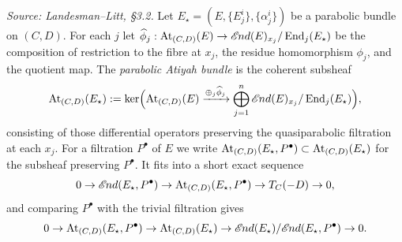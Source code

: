 \begin{definition}
  \label{def:parabolic-atiyah-bundle}
  \textit{Source: Landesman--Litt, \S3.2.}
  Let $E_\star = (E,\{E^i_j\},\{\alpha^i_j\})$ be a parabolic bundle on $(C,D)$.
  For each $j$ let $\widehat{\phi}_j: \operatorname{At}_{(C,D)}(E) \to
  \mathscr{E}\kern -1pt nd(E)_{x_j}/\operatorname{End}_j(E_\star)$ be the composition of restriction to
  the fibre at $x_j$, the residue homomorphism $\phi_j$, and the quotient map.
  The \emph{parabolic Atiyah bundle} is the coherent subsheaf
  \[
    \operatorname{At}_{(C,D)}(E_\star) := \ker\Bigl(\operatorname{At}_{(C,D)}(E)
    \xrightarrow{\oplus_j \widehat{\phi}_j}
    \bigoplus_{j=1}^n \mathscr{E}\kern -1pt nd(E)_{x_j}/\operatorname{End}_j(E_\star)\Bigr),
  \]
  consisting of those differential operators preserving the quasiparabolic
  filtration at each $x_j$. For a filtration $P^\bullet$ of $E$ we write
  $\operatorname{At}_{(C,D)}(E_\star,P^\bullet) \subset \operatorname{At}_{(C,D)}(E_\star)$ for the
  subsheaf preserving $P^\bullet$. It fits into a short exact sequence
  \begin{equation}
    \label{eq:atiyah-ses-parabolic}
    0 \to \mathscr{E}\kern -1pt nd(E_\star,P^\bullet) \to
    \operatorname{At}_{(C,D)}(E_\star,P^\bullet) \to T_C(-D) \to 0,
  \end{equation}
  and comparing $P^\bullet$ with the trivial filtration gives
  \begin{equation}
    \label{eq:quotient-atiyah-bundles}
    0 \to \operatorname{At}_{(C,D)}(E_\star,P^\bullet) \to \operatorname{At}_{(C,D)}(E_\star)
    \to \mathscr{E}\kern -1pt nd(E_\star)/\mathscr{E}\kern -1pt nd(E_\star,P^\bullet) \to 0.
  \end{equation}
\end{definition}

